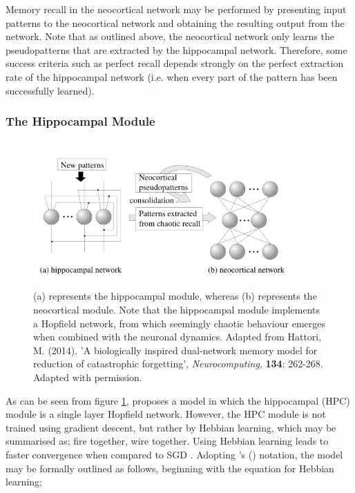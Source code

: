Memory recall in the neocortical network may be performed by presenting input patterns to the neocortical network and obtaining the resulting output from the network. Note that as outlined above, the neocortical network only learns the pseudopatterns that are extracted by the hippocampal network. Therefore, some success criteria such as perfect recall depends strongly on the perfect extraction rate of the hippocampal network (i.e. when every part of the pattern has been successfully learned).

\subsubsection{The Hippocampal Module}
\subsubsection{\cite{Hattori2010}}
\begin{figure}
\centering
\includegraphics[width=10cm]{fig/hattori2010_model_structure}
\caption{(a) represents the hippocampal module, whereas (b) represents the neocortical module. Note that the hippocampal module implements a Hopfield network, from which seemingly chaotic behaviour emerges when combined with the neuronal dynamics. Adapted from Hattori, M. (2014). 'A biologically inspired dual-network memory model for reduction of catastrophic forgetting', \textit{Neurocomputing}, \textbf{134}: 262-268. Adapted with permission.}
\label{fig:hattori2010_model_structure}
\end{figure}

As can be seen from figure \ref{fig:hattori2010_model_structure}, \cite{Hattori2010} proposes a model in which the hippocampal (HPC) module is a single layer Hopfield network. However, the HPC module is not trained using gradient descent, but rather by Hebbian learning, which may be summarised as; fire together, wire together. Using Hebbian learning leads to faster convergence when compared to SGD \citep{Hattori2010}. Adopting \citeauthor{Hattori2010}'s (\citeyear{Hattori2010}) notation, the model may be formally outlined as follows, beginning with the equation for Hebbian learning;

